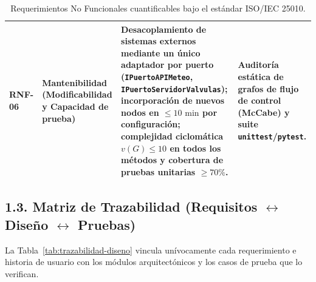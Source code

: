 \documentclass[12pt,letterpaper]{report}
\begin{document}
\begin{table}[H]
\begin{tabularx}{\linewidth}{|L{1.4cm}|L{3.1cm}|Y|L{3.2cm}|}
        \hline
        \textbf{RNF-06} & Mantenibilidad (Modificabilidad y Capacidad de prueba) & Desacoplamiento de sistemas externos mediante un único adaptador por puerto (\texttt{IPuertoAPIMeteo}, \texttt{IPuertoServidorValvulas}); incorporación de nuevos nodos en $\le 10\text{ min}$ por configuración; complejidad ciclomática $v(G) \le 10$ en todos los métodos y cobertura de pruebas unitarias $\ge 70\%$. & Auditoría estática de grafos de flujo de control (McCabe) y suite \texttt{unittest}/\texttt{pytest}. \\
        \hline
    \end{tabularx}
    \caption{Requerimientos No Funcionales cuantificables bajo el estándar ISO/IEC 25010.}
    \label{tab:rnf-sintesis}
\end{table}

\subsection*{1.3. Matriz de Trazabilidad (Requisitos $\leftrightarrow$ Diseño $\leftrightarrow$ Pruebas)}

La Tabla~\ref{tab:trazabilidad-diseno} vincula unívocamente cada requerimiento e historia de usuario con los módulos arquitectónicos y los casos de prueba que lo verifican.
\end{document}
